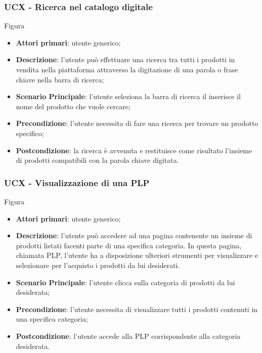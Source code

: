 \subsubsection{UCX - Ricerca nel catalogo digitale}
Figura \\
\begin{itemize}
\item \textbf{Attori primari}: utente generico;
\item \textbf{Descrizione}: l'utente può effettuare una ricerca tra tutti i prodotti in vendita nella piattaforma attraverso la digitazione di una parola o frase chiave nella barra di ricerca;
\item \textbf{Scenario Principale}: l'utente seleziona la barra di ricerca il inserisce il nome del prodotto che vuole cercare;
\item \textbf{Precondizione}: l'utente necessita di fare una ricerca per trovare un prodotto specifico;
\item \textbf{Postcondizione}: la ricerca è avvenuta e restituisce come risultato l'insieme di prodotti compatibili con la parola chiave digitata.
\end{itemize}
\subsubsection{UCX - Visualizzazione di una PLP}
Figura \\
\begin{itemize}
\item \textbf{Attori primari}: utente generico;
\item \textbf{Descrizione}: l'utente può accedere ad una pagina contenente un insieme di prodotti listati facenti parte di una specifica categoria. In questa pagina, chiamata PLP, l'utente ha a disposizione ulteriori strumenti per visualizzare e selezionare per l'acquisto i prodotti da lui desiderati.
\item \textbf{Scenario Principale}: l'utente clicca sulla categoria di prodotti da lui desiderata;
\item \textbf{Precondizione}: l'utente necessita di visualizzare tutti i prodotti contenuti in una specifica categoria;
\item \textbf{Postcondizione}: l'utente accede alla PLP corrispondente alla categoria desiderata.
\end{itemize}
